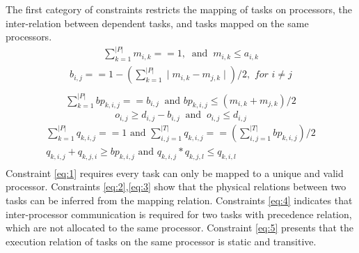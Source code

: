  The first category of constraints restricts the mapping of tasks on processors,  the inter-relation between dependent tasks, and tasks mapped on the same processors.
 	\begin{equation}\label{eq:1}
	\begin{array}{l} 
		\sum_{k=1}^{|P|}m_{i,k}==1, ~\textrm{ and }~m_{i,k} \leq a_{i,k} 
	\end{array}
	\end{equation}
	\begin{equation}\label{eq:2}
	\begin{array}{l} 
		b_{i,j}== 1-(\sum_{k=1}^{|P|} \mid m_{i,k}-m_{j,k}\mid)/2, \textit{ for }  i\neq j\\
	\end{array}
	\end{equation}
	\begin{equation}\label{eq:3}
	\begin{array}{l} 
		\sum^{|P|}_{k=1} bp_{k,i,j} == b_{i,j}  ~\textrm{ and }
		bp_{k,i,j} \leq (m_{i,k} + m_{j,k})/2
	\end{array}		
	\end{equation}
	\begin{equation}\label{eq:4}
			o_{i,j} \geq d_{i,j} - b_{i,j}  ~\textrm{ and }~
			o_{i,j} \leq d_{i,j}
	\end{equation}
	\begin{equation}\label{eq:5}
		\begin{array}{l}
			\sum^{|P|}_{k=1} q_{k,i,j}==1 \textrm{ and } \sum^{|T|}_{i,j=1} q_{k,i,j} == (\sum^{|T|}_{i,j=1} bp_{k,i,j}) /2\\
			q_{k,i,j} + q_{k,j,i} \geq bp_{k,i,j} \textrm{ and }q_{k,i,j}*q_{k,j,l}\leq q_{k,i,l} \\
		\end{array}
	\end{equation}
Constraint \ref{eq:1} requires every task can only be mapped to a unique and valid processor. %
Constraints \ref{eq:2},\ref{eq:3} show that the physical relations between two tasks can be inferred from the mapping relation.
Constraints \ref{eq:4} indicates that inter-processor communication is required for two tasks with precedence relation, which are not allocated to the same processor.
Constraint \ref{eq:5} presents that the execution relation of tasks on the same processor is static and transitive. 
	
